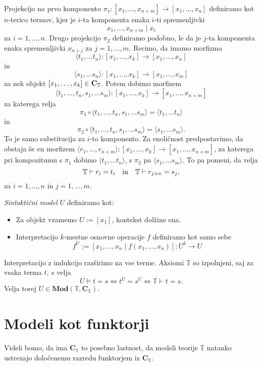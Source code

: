 \documentclass[../kategoricna_logika.tex]{subfiles}
\begin{document}
\begin{dokaz}
  Projekcijo na prvo komponento $\pi_1: [x_1, \ldots, x_{n+m}] \to [x_1, \ldots, x_n]$
  definiramo kot $n$-terico termov, kjer je $i$-ta komponenta enaka $i$-ti spremenljivki
  \[ x_1, \ldots, x_{n+m} \mid x_i\]
  za $i = 1, \ldots, n$. Drugo projekcijo $\pi_2$ definiramo podobno, le da je $j$-ta
  komponenta enaka spremenljivki $x_{n+j}$ za $j = 1, \ldots, m$. Recimo, da imamo morfizma
  \[\langle t_1, \ldots t_n \rangle: [x_1, \ldots, x_k] \to [x_1, \ldots, x_n]\]
  in
  \[\langle s_1, \ldots s_n \rangle: [x_1, \ldots, x_k] \to [x_1, \ldots, x_m]\]
  za nek objekt $[x_1, \ldots, x_k] \in {\operatorname{\mathbf{C}}}_{\mathbb{T}}$.
  Potem dobimo morfizem
  \[\langle t_1, \ldots, t_n, s_1, \ldots s_m \rangle: [x_1, \ldots, x_k] \to [x_1, \ldots, x_{n+m}]\]
  za katerega velja
  \[\pi_1 \circ \langle t_1, \ldots, t_n, s_1, \ldots s_m \rangle = \langle t_1, \ldots t_n \rangle\]
  in
  \[\pi_2 \circ \langle t_1, \ldots, t_n, s_1, \ldots s_m \rangle = \langle s_1, \ldots s_m \rangle.\]
  To je samo substitucija za $i$-to komponento.
  Za enoličnost predpostavimo, da obstaja še en morfizem
  $\langle r_1, \ldots, r_{n+m} \rangle :  [x_1, \ldots, x_k] \to [x_1, \ldots, x_{n+m}]$,
  za katerega pri kompozitumu s $\pi_1$ dobimo $\langle t_1, \ldots t_n \rangle$,
  s $\pi_2$ pa $\langle s_1, \ldots s_m \rangle$. To pa pomeni, da velja
  \[ \mathbb{T} \vdash r_i = t_i \quad \text{in} \quad  \mathbb{T} \vdash r_{j+n} = s_j,\]
  za  $i = 1, \ldots, n$ in $j = 1, \ldots, m$.
\end{dokaz}
%
\begin{definicija}\label{def:sintaktični_model}
\emph{Sintaktični model} $U$ definiramo kot:
\begin{itemize}
\item Za objekt vzamemo $U := [x_1]$, kontekst dolžine ena.
%
\item Interpretacijo $k$-mestne osnovne operacije $f$ definiramo kot
  samo sebe
$$f^U := [x_1, \ldots, x_n \mid f(x_1, \ldots, x_n)] : U^k \to U$$
\end{itemize}
%
Interpretacijo z indukcijo razširimo na vse terme.
Aksiomi $\mathbb{T}$ so izpolnjeni, saj za vsaka terma $t$, $s$ velja
$$U \models t = s \Longleftrightarrow t^U = s^U \Longleftrightarrow \mathbb{T} \vdash t = s.$$
Velja torej
$U \in \mathbf{Mod}(\mathbb{T}, \mathbf{C}_\mathbb{T})$.
\end{definicija}
%
\section{Modeli kot funktorji}
%
Videli bomo, da ima $\mathbf{C}_{\mathbb{T}}$ to posebno lastnost, da modeli
teorije $\mathbb{T}$ natanko ustrezajo določenemu razredu funktorjem iz $\mathbf{C}_{\mathbb{T}}$.
\end{document}
